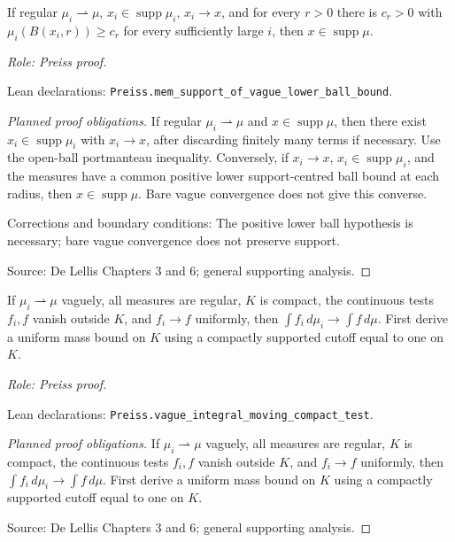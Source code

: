 \begin{lemma}
\label{lem:vague-support-limit}







If regular $\mu_i\rightharpoonup\mu$, $x_i\in\operatorname{supp}\mu_i$, $x_i\to x$, and for every $r>0$ there is $c_r>0$ with $\mu_i(B(x_i,r))\geq c_r$ for every sufficiently large $i$, then $x\in\operatorname{supp}\mu$.
\par\emph{Role: Preiss proof.}
\par Lean declarations: \texttt{Preiss.mem\_support\_of\_vague\_lower\_ball\_bound}.
\end{lemma}
\begin{proof}[Planned proof obligations]

If regular $\mu_i\rightharpoonup\mu$ and $x\in\operatorname{supp}\mu$, then
there exist $x_i\in\operatorname{supp}\mu_i$ with $x_i\to x$, after discarding
finitely many terms if necessary. Use the open-ball portmanteau inequality.
Conversely, if $x_i\to x$, $x_i\in\operatorname{supp}\mu_i$, and the measures
have a common positive lower support-centred ball bound at each radius, then
$x\in\operatorname{supp}\mu$. Bare vague convergence does not give this converse.
\par Corrections and boundary conditions: The positive lower ball hypothesis is necessary; bare vague convergence does not preserve support.
\par Source: De Lellis Chapters 3 and 6; general supporting analysis.
\end{proof}

\begin{lemma}
\label{lem:vague-moving-tests}








If $\mu_i\rightharpoonup\mu$ vaguely, all measures are regular, $K$ is compact,
the continuous tests $f_i,f$ vanish outside $K$, and $f_i\to f$ uniformly,
then $\int f_i\,d\mu_i\to\int f\,d\mu$. First derive a uniform mass bound on
$K$ using a compactly supported cutoff equal to one on $K$.
\par\emph{Role: Preiss proof.}
\par Lean declarations: \texttt{Preiss.vague\_integral\_moving\_compact\_test}.
\end{lemma}
\begin{proof}[Planned proof obligations]

If $\mu_i\rightharpoonup\mu$ vaguely, all measures are regular, $K$ is compact,
the continuous tests $f_i,f$ vanish outside $K$, and $f_i\to f$ uniformly,
then $\int f_i\,d\mu_i\to\int f\,d\mu$. First derive a uniform mass bound on
$K$ using a compactly supported cutoff equal to one on $K$.
\par Source: De Lellis Chapters 3 and 6; general supporting analysis.
\end{proof}


